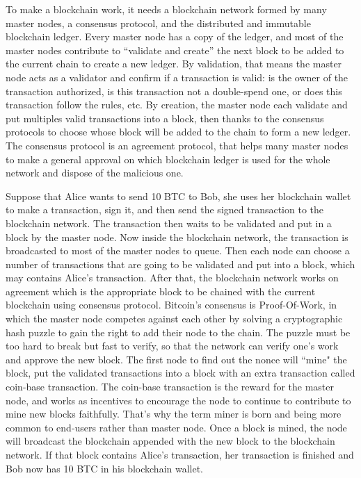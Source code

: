 To make a blockchain work, it needs a blockchain network formed by many master nodes, a consensus protocol, and the distributed and immutable blockchain ledger. Every master node has a copy of the ledger, and most of the master nodes contribute to “validate and create” the next block to be added to the current chain to create a new ledger. By validation, that means the master node acts as a validator and confirm if a transaction is valid: is the owner of the transaction authorized, is this transaction not a double-spend one, or does this transaction follow the rules, etc. By creation, the master node each validate and put multiples valid transactions into a block, then thanks to the consensus protocols to choose whose block will be added to the chain to form a new ledger. The consensus protocol is an agreement protocol, that helps many master nodes to make a general approval on which blockchain ledger is used for the whole network and dispose of the malicious one.

Suppose that Alice wants to send 10 BTC to Bob, she uses her blockchain wallet to make a transaction, sign it, and then send the signed transaction to the blockchain network. The transaction then waits to be validated and put in a block by the master node. Now inside the blockchain network, the transaction is broadcasted to most of the master nodes to queue. Then each node can choose a number of transactions that are going to be validated and put into a block, which may contains Alice's transaction. After that, the blockchain network works on agreement which is the appropriate block to be chained with the current blockchain using consensus protocol. Bitcoin's consensus is Proof-Of-Work, in which the master node competes against each other by solving a cryptographic hash puzzle to gain the right to add their node to the chain. The puzzle must be too hard to break but fast to verify, so that the network can verify one's work and approve the new block. The first node to find out the nonce will ``mine" the block, put the validated transactions into a block with an extra transaction called coin-base transaction. The coin-base transaction is the reward for the master node, and works as incentives to encourage the node to continue to contribute to mine new blocks faithfully. That's why the term miner is born and being more common to end-users rather than master node. Once a block is mined, the node will broadcast the blockchain appended with the new block to the blockchain network. If that block contains Alice's transaction, her transaction is finished and Bob now has 10 BTC in his blockchain wallet.

